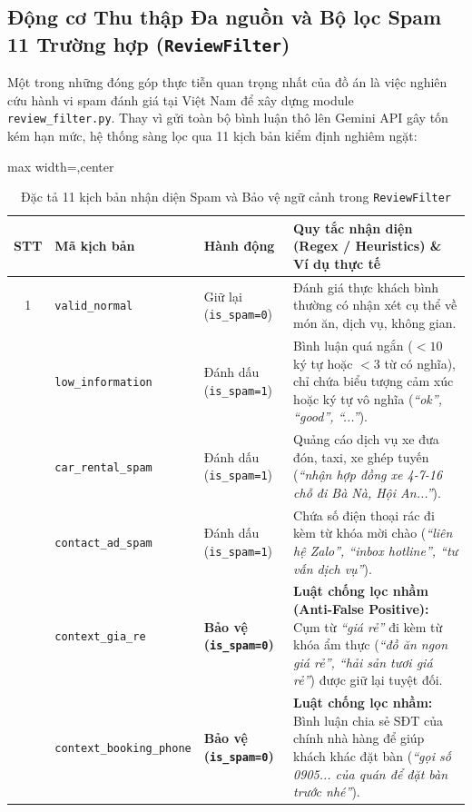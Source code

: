 \documentclass[12pt, a4paper]{article}
\begin{document}
\subsection{Động cơ Thu thập Đa nguồn và Bộ lọc Spam 11 Trường hợp (\texttt{ReviewFilter})}
Một trong những đóng góp thực tiễn quan trọng nhất của đồ án là việc nghiên cứu hành vi spam đánh giá tại Việt Nam để xây dựng module \texttt{review\_filter.py}. Thay vì gửi toàn bộ bình luận thô lên Gemini API gây tốn kém hạn mức, hệ thống sàng lọc qua 11 kịch bản kiểm định nghiêm ngặt:

\begin{table}[!htbp]
\centering
\caption{Đặc tả 11 kịch bản nhận diện Spam và Bảo vệ ngữ cảnh trong \texttt{ReviewFilter}}
\vspace{0.15cm}
\scriptsize
\begin{adjustbox}{max width=\textwidth,center}
\begin{tabularx}{0.97\textwidth}{c l l X}
\toprule
\rowcolor{blue!8}
\textbf{STT} & \textbf{Mã kịch bản} & \textbf{Hành động} & \textbf{Quy tắc nhận diện (Regex / Heuristics) \& Ví dụ thực tế} \\
\midrule
1 & \texttt{valid\_normal} & Giữ lại (\texttt{is\_spam=0}) & Đánh giá thực khách bình thường có nhận xét cụ thể về món ăn, dịch vụ, không gian. \\
\addlinespace
2 & \texttt{low\_information} & Đánh dấu (\texttt{is\_spam=1}) & Bình luận quá ngắn ($< 10$ ký tự hoặc $< 3$ từ có nghĩa), chỉ chứa biểu tượng cảm xúc hoặc ký tự vô nghĩa (\textit{``ok'', ``good'', ``...''}). \\
\addlinespace
3 & \texttt{car\_rental\_spam} & Đánh dấu (\texttt{is\_spam=1}) & Quảng cáo dịch vụ xe đưa đón, taxi, xe ghép tuyến (\textit{``nhận hợp đồng xe 4-7-16 chỗ đi Bà Nà, Hội An...''}). \\
\addlinespace
4 & \texttt{contact\_ad\_spam} & Đánh dấu (\texttt{is\_spam=1}) & Chứa số điện thoại rác đi kèm từ khóa mời chào (\textit{``liên hệ Zalo'', ``inbox hotline'', ``tư vấn dịch vụ''}). \\
\addlinespace
5 & \texttt{context\_gia\_re} & \textbf{Bảo vệ (\texttt{is\_spam=0})} & \textbf{Luật chống lọc nhầm (Anti-False Positive):} Cụm từ \textit{``giá rẻ''} đi kèm từ khóa ẩm thực (\textit{``đồ ăn ngon giá rẻ'', ``hải sản tươi giá rẻ''}) được giữ lại tuyệt đối. \\
\addlinespace
6 & \texttt{context\_booking\_phone} & \textbf{Bảo vệ (\texttt{is\_spam=0})} & \textbf{Luật chống lọc nhầm:} Bình luận chia sẻ SĐT của chính nhà hàng để giúp khách khác đặt bàn (\textit{``gọi số 0905... của quán để đặt bàn trước nhé''}). \\

\end{tabularx}
\end{adjustbox}
\end{table}
\end{document}
